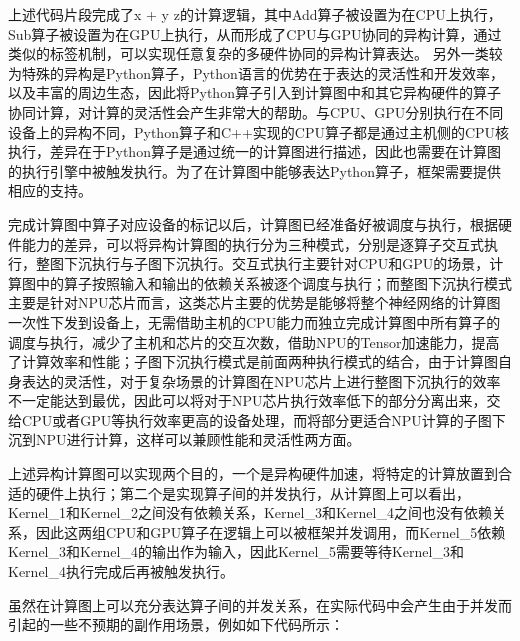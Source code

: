 \documentclass[letterpaper,10pt,english]{sphinxmanual}
\begin{document}
\sphinxAtStartPar
上述代码片段完成了x + y \sphinxhyphen{}
z的计算逻辑，其中Add算子被设置为在CPU上执行，Sub算子被设置为在GPU上执行，从而形成了CPU与GPU协同的异构计算，通过类似的标签机制，可以实现任意复杂的多硬件协同的异构计算表达。
另外一类较为特殊的异构是Python算子，Python语言的优势在于表达的灵活性和开发效率，以及丰富的周边生态，因此将Python算子引入到计算图中和其它异构硬件的算子协同计算，对计算的灵活性会产生非常大的帮助。与CPU、GPU分别执行在不同设备上的异构不同，Python算子和C++实现的CPU算子都是通过主机侧的CPU核执行，差异在于Python算子是通过统一的计算图进行描述，因此也需要在计算图的执行引擎中被触发执行。为了在计算图中能够表达Python算子，框架需要提供相应的支持。

\sphinxAtStartPar
完成计算图中算子对应设备的标记以后，计算图已经准备好被调度与执行，根据硬件能力的差异，可以将异构计算图的执行分为三种模式，分别是逐算子交互式执行，整图下沉执行与子图下沉执行。交互式执行主要针对CPU和GPU的场景，计算图中的算子按照输入和输出的依赖关系被逐个调度与执行；而整图下沉执行模式主要是针对NPU芯片而言，这类芯片主要的优势是能够将整个神经网络的计算图一次性下发到设备上，无需借助主机的CPU能力而独立完成计算图中所有算子的调度与执行，减少了主机和芯片的交互次数，借助NPU的Tensor加速能力，提高了计算效率和性能；子图下沉执行模式是前面两种执行模式的结合，由于计算图自身表达的灵活性，对于复杂场景的计算图在NPU芯片上进行整图下沉执行的效率不一定能达到最优，因此可以将对于NPU芯片执行效率低下的部分分离出来，交给CPU或者GPU等执行效率更高的设备处理，而将部分更适合NPU计算的子图下沉到NPU进行计算，这样可以兼顾性能和灵活性两方面。

\sphinxAtStartPar
上述异构计算图可以实现两个目的，一个是异构硬件加速，将特定的计算放置到合适的硬件上执行；第二个是实现算子间的并发执行，从计算图上可以看出，Kernel\_1和Kernel\_2之间没有依赖关系，Kernel\_3和Kernel\_4之间也没有依赖关系，因此这两组CPU和GPU算子在逻辑上可以被框架并发调用，而Kernel\_5依赖Kernel\_3和Kernel\_4的输出作为输入，因此Kernel\_5需要等待Kernel\_3和Kernel\_4执行完成后再被触发执行。

\sphinxAtStartPar
虽然在计算图上可以充分表达算子间的并发关系，在实际代码中会产生由于并发而引起的一些不预期的副作用场景，例如如下代码所示：
\end{document}
